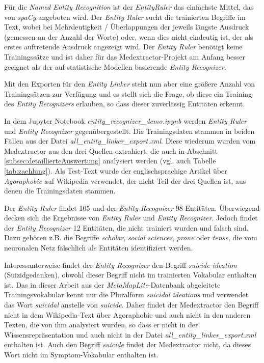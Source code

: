 Für die \emph{Named Entity Recognition} ist der \emph{EntityRuler} das einfachste Mittel, das von \emph{spaCy} angeboten wird. Der \emph{Entity Ruler} sucht die trainierten Begriffe im Text, wobei bei Mehrdeutigkeit / Überlappungen der jeweils längste Ausdruck (gemessen an der Anzahl der Worte) oder, wenn dies nicht eindeutig ist, der als erstes auftretende Ausdruck angezeigt wird. Der \emph{Entity Ruler} benötigt keine Trainingssätze und ist daher für das Medextractor-Projekt am Anfang besser geeignet als der auf statistische Modellen basierende \emph{Entity Recognizer}.

Mit den Exporten für den \emph{Entity Linker} steht nun aber eine größere Anzahl von Trainingsätzen zur Verfügung und es stellt sich die Frage, ob diese ein Training des \emph{Entity Recognizers} erlauben, so dass dieser zuverlässig Entitäten erkennt.

In dem Jupyter Notebook \emph{entity\_recognizer\_demo.ipynb} werden \emph{Entity Ruler} und \emph{Entity Recognizer} gegenübergestellt. Die Trainingsdaten stammen in beiden Fällen aus der Datei \emph{all\_entity\_linker\_export.xml}. Diese wiederum wurden vom Medextractor aus den drei Quellen extrahiert, die auch in Abschnitt \ref{subsec:detaillierteAuswertung} analysiert werden (vgl. auch Tabelle \ref{tab:zaehlung}). Als Test-Text wurde der englischsprachige Artikel über \emph{Agoraphobie} auf Wikipedia verwendet, der nicht Teil der drei Quellen ist, aus denen die Trainingsdaten stammen.

Der \emph{Entity Ruler} findet 105 und der \emph{Entity Recognizer} 98 Entitäten. Überwiegend decken sich die Ergebnisse von \emph{Entity Ruler} und \emph{Entity Recognizer}. Jedoch findet der \emph{Entity Recognizer} 12 Entitäten, die nicht trainiert wurden und falsch sind. Dazu gehören z.B. die Begriffe \emph{scholar}, \emph{social sciences}, \emph{prone} oder \emph{tense}, die vom neuronalen Netz fälschlich als Entitäten identifiziert werden.

Interessanterweise findet der \emph{Entity Recognizer} den Begriff \emph{suicide ideation} (Suizidgedanken), obwohl dieser Begriff nicht im trainierten Vokabular enthalten ist. Das in dieser Arbeit aus der \emph{MetaMapLite}-Datenbank abgeleitete Trainingsvokabular kennt nur die Pluralform \emph{suicidal ideations} und verwendet das Wort \emph{suicidal} anstelle von \emph{suicide}. Daher findet der Medextractor den Begriff nicht in dem Wikipedia-Text über Agoraphobie und auch nicht in den anderen Texten, die von ihm analysiert wurden, so dass er nicht in der Wissensrepräsentation und auch nicht in der Datei \emph{all\_entity\_linker\_export.xml} enthalten ist. Auch den Begriff \emph{suicide} findet der Medextractor nicht, da dieses Wort nicht im Symptom-Vokabular enthalten ist.

